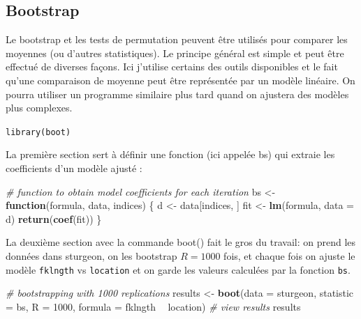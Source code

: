 \documentclass[12pt,]{book}
\newenvironment{Shaded}{\begin{snugshade}}{\end{snugshade}}
\newcommand{\CommentTok}[1]{\textcolor[rgb]{0.37,0.37,0.37}{\textit{#1}}}
\newcommand{\ControlFlowTok}[1]{\textcolor[rgb]{0.27,0.27,0.27}{\textbf{#1}}}
\newcommand{\DataTypeTok}[1]{\textcolor[rgb]{0.27,0.27,0.27}{#1}}
\newcommand{\DecValTok}[1]{\textcolor[rgb]{0.06,0.06,0.06}{#1}}
\newcommand{\KeywordTok}[1]{\textcolor[rgb]{0.27,0.27,0.27}{\textbf{#1}}}
\newcommand{\NormalTok}[1]{#1}
\newcommand{\OperatorTok}[1]{\textcolor[rgb]{0.43,0.43,0.43}{\textbf{#1}}}
\newcommand{\StringTok}[1]{\textcolor[rgb]{0.5,0.5,0.5}{#1}}
\begin{document}
\hypertarget{bootstrap}{%
\subsection{Bootstrap}\label{bootstrap}}

Le bootstrap et les tests de permutation peuvent être utilisés pour comparer les moyennes (ou d'autres statistiques). Le principe général est simple et peut être effectué de diverses façons. Ici j'utilise certains des outils disponibles et le fait qu'une comparaison de moyenne peut être représentée par un modèle linéaire. On pourra utiliser un programme similaire plus tard quand on ajustera des modèles plus complexes.

\texttt{library(boot)}

La première section sert à définir une fonction (ici appelée bs) qui extraie les coefficients d'un modèle ajusté :

\begin{Shaded}
\begin{Highlighting}[]
\CommentTok{# function to obtain model coefficients for each iteration}
\NormalTok{bs <-}\StringTok{ }\ControlFlowTok{function}\NormalTok{(formula, data, indices) \{}
\NormalTok{  d <-}\StringTok{ }\NormalTok{data[indices, ]}
\NormalTok{  fit <-}\StringTok{ }\KeywordTok{lm}\NormalTok{(formula, }\DataTypeTok{data =}\NormalTok{ d)}
  \KeywordTok{return}\NormalTok{(}\KeywordTok{coef}\NormalTok{(fit))}
\NormalTok{\}}
\end{Highlighting}
\end{Shaded}

La deuxième section avec la commande boot() fait le gros du travail: on prend les données dans sturgeon, on les bootstrap \(R = 1000\) fois, et chaque fois on ajuste le modèle \texttt{fklngth} vs \texttt{location} et on garde les valeurs calculées par la fonction \texttt{bs}.

\begin{Shaded}
\begin{Highlighting}[]
\CommentTok{# bootstrapping with 1000 replications}
\NormalTok{results <-}\StringTok{ }\KeywordTok{boot}\NormalTok{(}\DataTypeTok{data =}\NormalTok{ sturgeon, }\DataTypeTok{statistic =}\NormalTok{ bs, }\DataTypeTok{R =} \DecValTok{1000}\NormalTok{,}
\DataTypeTok{formula =}\NormalTok{ fklngth }\OperatorTok{~}\StringTok{ }\NormalTok{location)}
\CommentTok{# view results}
\NormalTok{results}
\end{Highlighting}
\end{Shaded}
\end{document}
